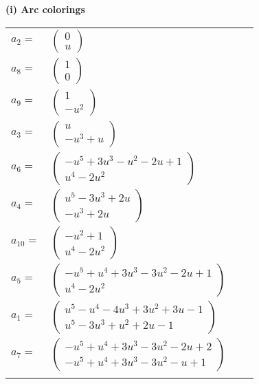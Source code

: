 \documentclass[1p]{elsarticle_modified}
\theoremstyle{definition}
\begin{document}
\flushleft \textbf{(i) Arc colorings}\\
\begin{tabular}{m{7pt} m{180pt} m{7pt} m{180pt} }
\flushright $a_{2}=$&$\begin{pmatrix}0\\u\end{pmatrix}$ \\
\flushright $a_{8}=$&$\begin{pmatrix}1\\0\end{pmatrix}$ \\
\flushright $a_{9}=$&$\begin{pmatrix}1\\- u^2\end{pmatrix}$ \\
\flushright $a_{3}=$&$\begin{pmatrix}u\\- u^3+u\end{pmatrix}$ \\
\flushright $a_{6}=$&$\begin{pmatrix}- u^5+3 u^3- u^2-2 u+1\\u^4-2 u^2\end{pmatrix}$ \\
\flushright $a_{4}=$&$\begin{pmatrix}u^5-3 u^3+2 u\\- u^3+2 u\end{pmatrix}$ \\
\flushright $a_{10}=$&$\begin{pmatrix}- u^2+1\\u^4-2 u^2\end{pmatrix}$ \\
\flushright $a_{5}=$&$\begin{pmatrix}- u^5+u^4+3 u^3-3 u^2-2 u+1\\u^4-2 u^2\end{pmatrix}$ \\
\flushright $a_{1}=$&$\begin{pmatrix}u^5- u^4-4 u^3+3 u^2+3 u-1\\u^5-3 u^3+u^2+2 u-1\end{pmatrix}$ \\
\flushright $a_{7}=$&$\begin{pmatrix}- u^5+u^4+3 u^3-3 u^2-2 u+2\\- u^5+u^4+3 u^3-3 u^2- u+1\end{pmatrix}$\\&\end{tabular}
\end{document}
